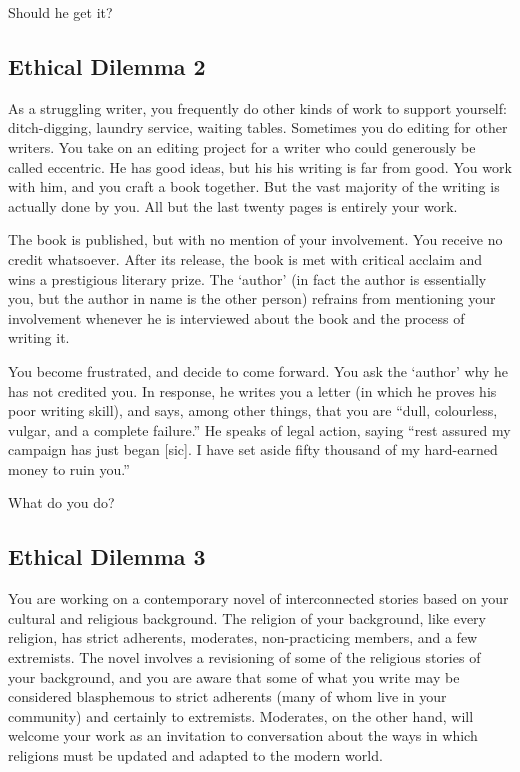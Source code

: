 \documentclass[letterpaper,oneside]{memoir}
\begin{document}
\begin{description}
Should he get it?

\subsection{Ethical Dilemma 2}
As a struggling writer, you frequently do other kinds of work to support yourself: ditch-digging, laundry service, waiting tables. Sometimes you do editing for other writers. You take on an editing project for a writer who could generously be called eccentric. He has good ideas, but his his writing is far from good. You work with him, and you craft a book together. But the vast majority of the writing is actually done by you. All but the last twenty pages is entirely your work.

The book is published, but with no mention of your involvement. You receive no credit whatsoever. After its release, the book is met with critical acclaim and wins a prestigious literary prize. The ‘author’ (in fact the author is essentially you, but the author in name is the other person) refrains from mentioning your involvement whenever he is interviewed about the book and the process of writing it.

You become frustrated, and decide to come forward. You ask the `author' why he has not credited you. In response, he writes you a letter (in which he proves his poor writing skill), and says, among other things, that you are ``dull, colourless, vulgar, and a complete failure.'' He speaks of legal action, saying ``rest assured my campaign has just began [sic]. I have set aside fifty thousand of my hard-earned money to ruin you.''

What do you do?

\subsection{Ethical Dilemma 3}
You are working on a contemporary novel of interconnected stories based on your cultural and religious background. The religion of your background, like every religion, has strict adherents, moderates, non-practicing members, and a few extremists. The novel involves a revisioning of some of the religious stories of your background, and you are aware that some of what you write may be considered blasphemous to strict adherents (many of whom live in your community) and certainly to extremists. Moderates, on the other hand, will welcome your work as an invitation to conversation about the ways in which religions must be updated and adapted to the modern world.


\end{description}
\end{document}
